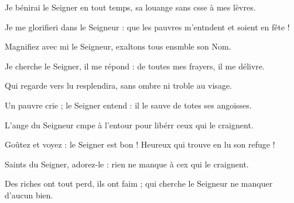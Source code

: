 \item Je bénirai le Seigner en tout temps,\psstar{} sa louange sans csse à mes lèvres.
\item Je me glorifieri dans le Seigneur :\psstar{} que les pauvres m’entndent et soient en fête !
\item Magnifiez avec mi le Seigneur,\psstar{} exaltons tous ensmble son Nom.
\item Je cherche le Seigner, il me répond :\psstar{} de toutes mes frayers, il me délivre.
\item Qui regarde vers lu resplendira,\psstar{} sans ombre ni troble au visage.
\item Un pauvre crie ; le Seigner entend :\psstar{} il le sauve de totes ses angoisses.
\item L’ange du Seigneur cmpe à l’entour\psstar{} pour libérr ceux qui le craignent.
\item Goûtez et voyez : le Seigner est bon !\psstar{} Heureux qui trouve en lu son refuge !
\item Saints du Seigner, adorez-le :\psstar{} rien ne manque à cex qui le craignent.
\item Des riches ont tout perd, ils ont faim ;\psstar{} qui cherche le Seigneur ne manquer d’aucun bien.